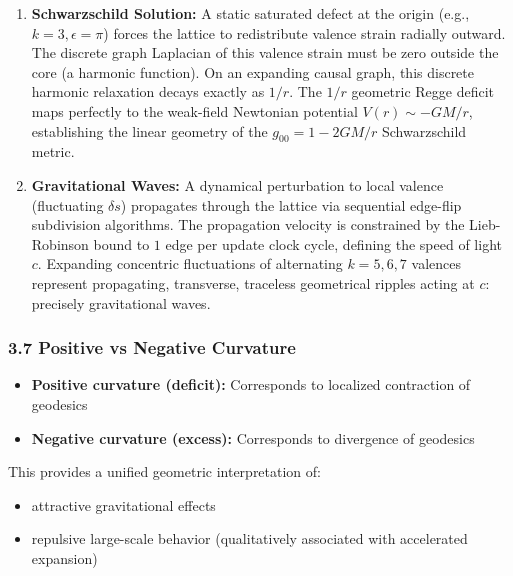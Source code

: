 \documentclass[
]{article}
\providecommand{\tightlist}{%
  \setlength{\itemsep}{0pt}\setlength{\parskip}{0pt}}
\begin{document}
\begin{enumerate}
\def\labelenumi{\arabic{enumi}.}
\item
  \textbf{Schwarzschild Solution:} A static saturated defect at the
  origin (e.g., \(k=3, \epsilon=\pi\)) forces the lattice to
  redistribute valence strain radially outward. The discrete graph
  Laplacian of this valence strain must be zero outside the core (a
  harmonic function). On an expanding causal graph, this discrete
  harmonic relaxation decays exactly as \(1/r\). The \(1/r\) geometric
  Regge deficit maps perfectly to the weak-field Newtonian potential
  \(V(r) \sim -GM/r\), establishing the linear geometry of the
  \(g_{00} = 1 - 2GM/r\) Schwarzschild metric.
\item
  \textbf{Gravitational Waves:} A dynamical perturbation to local
  valence (fluctuating \(\delta s\)) propagates through the lattice via
  sequential edge-flip subdivision algorithms. The propagation velocity
  is constrained by the Lieb-Robinson bound to \(1\) edge per update
  clock cycle, defining the speed of light \(c\). Expanding concentric
  fluctuations of alternating \(k=5, 6, 7\) valences represent
  propagating, transverse, traceless geometrical ripples acting at
  \(c\): precisely gravitational waves.
\end{enumerate}

\hypertarget{positive-vs-negative-curvature}{%
\subsubsection{3.7 Positive vs Negative
Curvature}\label{positive-vs-negative-curvature}}

\begin{itemize}
\item
  \textbf{Positive curvature (deficit):} Corresponds to localized
  contraction of geodesics
\item
  \textbf{Negative curvature (excess):} Corresponds to divergence of
  geodesics
\end{itemize}

This provides a unified geometric interpretation of:

\begin{itemize}
\tightlist
\item
  attractive gravitational effects
\item
  repulsive large-scale behavior (qualitatively associated with
  accelerated expansion)
\end{itemize}
\end{document}
